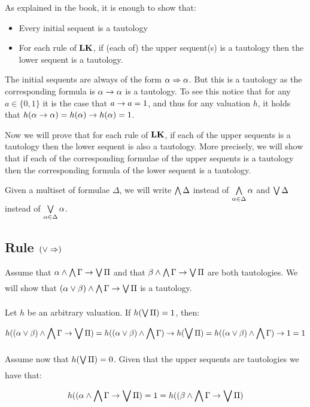 As explained in the book, it is enough to show that:

\begin{itemize}
    \item Every initial sequent is a tautology
    \item For each rule of $\textbf{LK}$, if (each of) the upper sequent(s) is a
    tautology then the lower sequent is a tautology.
\end{itemize}

The initial sequents are always of the form $\alpha \Rightarrow \alpha$. But this is
a tautology as the corresponding formula is $\alpha \rightarrow \alpha$ is a
tautology. To see this notice that for any $a \in \{0, 1\}$ it is the case that
$a \rightarrow a = 1$, and thus for any valuation $h$, it holds that $h(\alpha
\rightarrow \alpha) = h(\alpha) \rightarrow h(\alpha) = 1$.

Now we will prove that for each rule of $\textbf{LK}$, if each of the upper sequents is
a tautology then the lower sequent is also a tautology. More precisely, we will
show that if each of the corresponding formulae of the upper sequents is a
tautology then the corresponding formula of the lower sequent is a tautology.

Given a multiset of formulae $\Delta$, we will write $\bigwedge\limits_{\substack{}} \Delta$ instead of
$\bigwedge\limits_{\substack{\alpha \in \Delta}} \alpha$ and $\bigvee\limits_{\substack{}} \Delta$ instead of $\bigvee\limits_{\substack{\alpha \in
\Delta}} \alpha$.

\subsection*{Rule $(\lor \Rightarrow)$}
Assume that $\alpha \land \bigwedge\limits_{\substack{}} \Gamma \rightarrow \bigvee\limits_{\substack{}} \Pi$ and that $\beta \land
\bigwedge\limits_{\substack{}} \Gamma \rightarrow \bigvee\limits_{\substack{}} \Pi$ are both tautologies. We will show that
$(\alpha \lor \beta) \land \bigwedge\limits_{\substack{}} \Gamma \rightarrow \bigvee\limits_{\substack{}} \Pi$ is a tautology.

Let $h$ be an arbitrary valuation. If $h(\bigvee\limits_{\substack{}} \Pi) = 1$, then:
\begin{equation*}
  h((\alpha \lor \beta) \land \bigwedge\limits_{\substack{}} \Gamma \rightarrow \bigvee\limits_{\substack{}} \Pi) = 
  h((\alpha \lor \beta) \land \bigwedge\limits_{\substack{}} \Gamma) \rightarrow h(\bigvee\limits_{\substack{}} \Pi) = 
  h((\alpha \lor \beta) \land \bigwedge\limits_{\substack{}} \Gamma) \rightarrow 1 = 1
\end{equation*}

Assume now that $h(\bigvee\limits_{\substack{}} \Pi) = 0$. Given that the upper sequents are
tautologies we have that:

\begin{equation*}
  h((\alpha \land \bigwedge\limits_{\substack{}} \Gamma \rightarrow \bigvee\limits_{\substack{}} \Pi) = 1 = 
  h((\beta \land \bigwedge\limits_{\substack{}} \Gamma \rightarrow \bigvee\limits_{\substack{}} \Pi)
\end{equation*}

